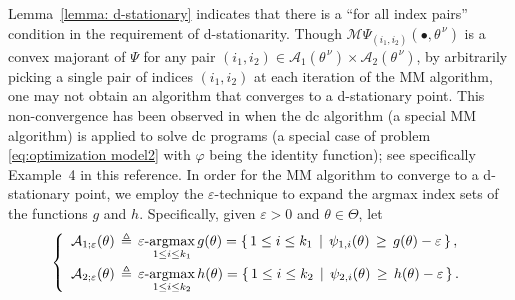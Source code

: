 \documentclass{siamart}
\begin{document}
Lemma~\ref{lemma: d-stationary} indicates that there is a ``for all index pairs'' condition in the requirement of d-stationarity.
Though $\mathcal{M}\Psi_{(i_1,i_2)}(\bullet,\theta^{\,\nu})$ is a convex majorant of $\Psi$ for any pair
$(i_1, i_2)\in \mathcal{A}_1(\theta^{\,\nu})\times \mathcal{A}_2(\theta^{\,\nu})$, by arbitrarily picking a single pair of indices
$(i_1,i_2)$ at each iteration of the MM algorithm, one may not obtain an algorithm that converges to a d-stationary point.
This non-convergence has been observed in \cite{PangRazaviyaynAlvarado16} when the dc algorithm (a special MM algorithm)
is applied to solve dc programs (a special case of problem \eqref{eq:optimization model2} with $\varphi$ being the identity function);
see specifically Example~4 in this reference.
In order for the MM algorithm to converge to a d-stationary point, we employ the $\varepsilon$-technique to
expand the argmax index sets of the functions $g$ and $h$.
Specifically, given $\varepsilon > 0$ and $\theta\in \Theta$, let
$$
\left\{\begin{array}{ll}
\mathcal{A}_{1;\varepsilon}(\theta) \, \triangleq \, \varepsilon{\text -}\displaystyle{
\operatornamewithlimits{\mbox{argmax}}_{1\leq i\leq k_1}
} \, g (\theta) =  \left\{ \, 1 \leq i \leq k_1 \, \mid \, \psi_{1,i}(\theta) \, \geq \, g(\theta) - \varepsilon \, \right\}, \\ [0.15in]
\mathcal{A}_{2;\varepsilon}(\theta) \, \triangleq \, \varepsilon{\text -}\displaystyle{
\operatornamewithlimits{\mbox{argmax}}_{1\leq i\leq k_2}
} \, h (\theta) =  \left\{ \, 1 \leq i \leq k_2 \, \mid \, \psi_{2,i}(\theta) \, \geq \, h(\theta) - \varepsilon \, \right\}.
\end{array}\right.
$$
\end{document}
